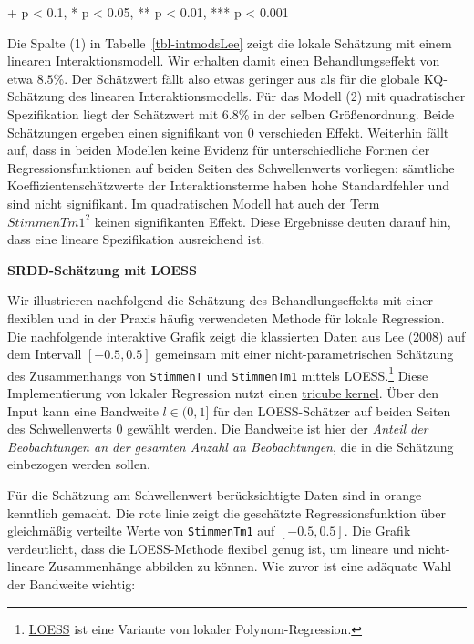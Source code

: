 \documentclass[
  a4paper,
  DIV=11,
  oneside]{scrreprt}
\begin{document}
\begin{minipage}{\linewidth}
+ p < 0.1, * p < 0.05, ** p < 0.01, *** p < 0.001\\
\end{minipage}

Die Spalte (1) in Tabelle~\ref{tbl-intmodsLee} zeigt die lokale
Schätzung mit einem linearen Interaktionsmodell. Wir erhalten damit
einen Behandlungseffekt von etwa \(8.5\%\). Der Schätzwert fällt also
etwas geringer aus als für die globale KQ-Schätzung des linearen
Interaktionsmodells. Für das Modell (2) mit quadratischer Spezifikation
liegt der Schätzwert mit \(6.8\%\) in der selben Größenordnung. Beide
Schätzungen ergeben einen signifikant von \(0\) verschieden Effekt.
Weiterhin fällt auf, dass in beiden Modellen keine Evidenz für
unterschiedliche Formen der Regressionsfunktionen auf beiden Seiten des
Schwellenwerts vorliegen: sämtliche Koeffizientenschätzwerte der
Interaktionsterme haben hohe Standardfehler und sind nicht signifikant.
Im quadratischen Modell hat auch der Term \(StimmenTm1^2\) keinen
signifikanten Effekt. Diese Ergebnisse deuten darauf hin, dass eine
lineare Spezifikation ausreichend ist.

\textbf{SRDD-Schätzung mit LOESS}

Wir illustrieren nachfolgend die Schätzung des Behandlungseffekts mit
einer flexiblen und in der Praxis häufig verwendeten Methode für lokale
Regression. Die nachfolgende interaktive Grafik zeigt die klassierten
Daten aus Lee (2008) auf dem Intervall \([-0.5,0.5]\) gemeinsam mit
einer nicht-parametrischen Schätzung des Zusammenhangs von
\texttt{StimmenT} und \texttt{StimmenTm1} mittels LOESS.\footnote{\href{https://en.wikipedia.org/wiki/Local_regression}{LOESS}
  ist eine Variante von lokaler Polynom-Regression.} Diese
Implementierung von lokaler Regression nutzt einen
\href{https://en.wikipedia.org/wiki/Kernel_(statistics)}{tricube
kernel}. Über den Input kann eine Bandweite \(l\in(0,1]\) für den
LOESS-Schätzer auf beiden Seiten des Schwellenwerts \(0\) gewählt
werden. Die Bandweite ist hier der \emph{Anteil der Beobachtungen an der
gesamten Anzahl an Beobachtungen}, die in die Schätzung einbezogen
werden sollen.

Für die Schätzung am Schwellenwert berücksichtigte Daten sind in orange
kenntlich gemacht. Die rote linie zeigt die geschätzte
Regressionsfunktion über gleichmäßig verteilte Werte von
\texttt{StimmenTm1} auf \([-0.5,0.5]\). Die Grafik verdeutlicht, dass
die LOESS-Methode flexibel genug ist, um lineare und nicht-lineare
Zusammenhänge abbilden zu können. Wie zuvor ist eine adäquate Wahl der
Bandweite wichtig:
\end{document}
